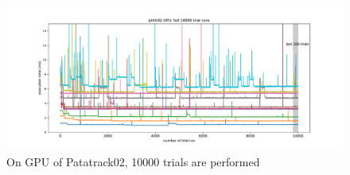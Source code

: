 \begin{figure}[ht!]
    \centering
    \includegraphics[trim=3cm 0cm 3cm 0cm, clip,width=\textwidth]{chapters/HGCal/figures/clue/private/addition_pttrk022.pdf}
    \caption{On GPU of Patatrack02, 10000 trials are performed}
\end{figure}




